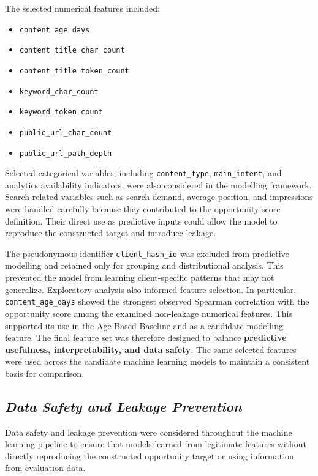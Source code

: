 \documentclass[12pt,a4paper]{report}
\begin{document}
The selected numerical features included:

\begin{itemize}
    \item \texttt{content\_age\_days}
    \item \texttt{content\_title\_char\_count}
    \item \texttt{content\_title\_token\_count}
    \item \texttt{keyword\_char\_count}
    \item \texttt{keyword\_token\_count}
    \item \texttt{public\_url\_char\_count}
    \item \texttt{public\_url\_path\_depth}
\end{itemize}

Selected categorical variables, including \texttt{content\_type}, \texttt{main\_intent}, and analytics availability indicators, were also considered in the modelling framework. Search-related variables such as search demand, average position, and impressions were handled carefully because they contributed to the opportunity score definition. Their direct use as predictive inputs could allow the model to reproduce the constructed target and introduce leakage.

The pseudonymous identifier \texttt{client\_hash\_id} was excluded from predictive modelling and retained only for grouping and distributional analysis. This prevented the model from learning client-specific patterns that may not generalize. Exploratory analysis also informed feature selection. In particular, \texttt{content\_age\_days} showed the strongest observed Spearman correlation with the opportunity score among the examined non-leakage numerical features. This supported its use in the Age-Based Baseline and as a candidate modelling feature. The final feature set was therefore designed to balance \textbf{predictive usefulness, interpretability, and data safety}. The same selected features were used across the candidate machine learning models to maintain a consistent basis for comparison.

\subsection{\textit{Data Safety and Leakage Prevention}}
Data safety and leakage prevention were considered throughout the machine learning pipeline to ensure that models learned from legitimate features without directly reproducing the constructed opportunity target or using information from evaluation data.
\end{document}
